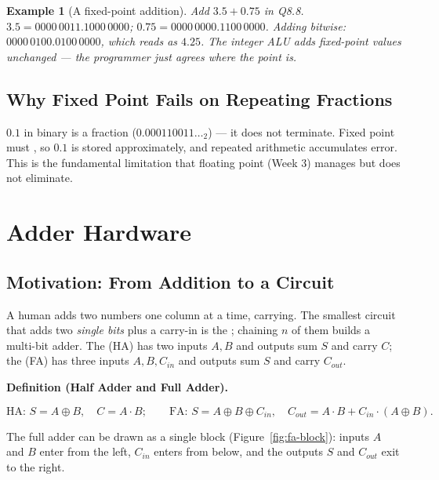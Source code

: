 \documentclass[11pt]{article}
\newtheorem{example}{Example}[section]
\newenvironment{definitionbox}[1]{%
  \par\noindent\textbf{Definition (#1).}\ \itshape
}{\par\vspace{0.3em}}
\begin{document}
\begin{example}[A fixed-point addition]
Add $3.5 + 0.75$ in Q8.8. $3.5 = 0000\,0011.1000\,0000$; $0.75 = 0000\,0000.1100\,0000$. Adding bitwise: $0000\,0100.0100\,0000$, which reads as $4.25$. The integer ALU adds fixed-point values unchanged --- the programmer just agrees where the point is.
\end{example}

\subsection{Why Fixed Point Fails on Repeating Fractions}

$0.1$ in binary is a  fraction ($0.000110011\dots_2$) --- it does not terminate. Fixed point must , so $0.1$ is stored approximately, and repeated arithmetic accumulates error. This is the fundamental limitation that floating point (Week 3) manages but does not eliminate.

\section{Adder Hardware}
\label{sec:adder}

\subsection{Motivation: From Addition to a Circuit}

A human adds two numbers one column at a time, carrying. The smallest circuit that adds two \emph{single bits} plus a carry-in is the ; chaining $n$ of them builds a multi-bit adder. The  (HA) has two inputs $A, B$ and outputs sum $S$ and carry $C$; the  (FA) has three inputs $A, B, C_{in}$ and outputs sum $S$ and carry $C_{out}$.

\begin{definitionbox}{Half Adder and Full Adder}
\[
  \text{HA: } S = A \oplus B, \quad C = A \cdot B; \qquad
  \text{FA: } S = A \oplus B \oplus C_{in}, \quad
  C_{out} = A\cdot B + C_{in}\cdot(A \oplus B).
\]
\end{definitionbox}

The full adder can be drawn as a single block (Figure~\ref{fig:fa-block}): inputs $A$ and $B$ enter from the left, $C_{in}$ enters from below, and the outputs $S$ and $C_{out}$ exit to the right.
\end{document}
